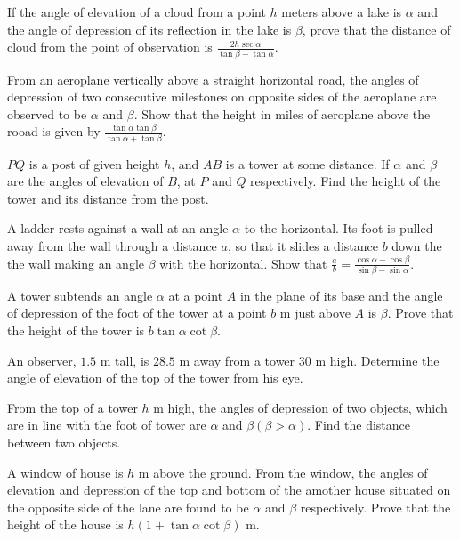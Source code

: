 \item If the angle of elevation of a cloud from a point $h$ meters above a lake is $\alpha$ and the angle of depression
  of its reflection in the lake is $\beta$, prove that the distance of cloud from the point of observation is
  $\frac{2h\sec\alpha}{\tan\beta - \tan\alpha}$.

\item From an aeroplane vertically above a straight horizontal road, the angles of depression of two consecutive milestones on
  opposite sides of the aeroplane are observed to be $\alpha$ and $\beta$. Show that the height in miles of
  aeroplane above the rooad is given by $\frac{\tan\alpha\tan\beta}{\tan\alpha + \tan\beta}$.

\item $PQ$ is a post of given height $h$, and $AB$ is a tower at some distance. If $\alpha$ and
  $\beta$ are the angles of elevation of $B$, at $P$ and $Q$ respectively. Find the height of the tower
  and its distance from the post.

\item A ladder rests against a wall at an angle $\alpha$ to the horizontal. Its foot is pulled away from the wall through a
  distance $a$, so that it slides a distance $b$ down the the wall making an angle $\beta$ with the
  horizontal. Show that $\frac{a}{b} = \frac{\cos\alpha - \cos\beta}{\sin\beta - \sin\alpha}$.

\item A tower subtends an angle $\alpha$ at a point $A$ in the plane of its base and the angle of depression of the foot
  of the tower at a point $b$ m just above $A$ is $\beta$. Prove that the height of the tower is
  $b\tan\alpha\cot\beta$.

\item An observer, $1.5$ m tall, is $28.5$ m away from a tower $30$ m high. Determine the angle of elevation of
  the top of the tower from his eye.

\item From the top of a tower $h$ m high, the angles of depression of two objects, which are in line with the foot of tower
  are $\alpha$ and $\beta (\beta > \alpha)$. Find the distance between two objects.

\item A window of house is $h$ m above the ground. From the window, the angles of elevation and depression of the top and
  bottom of the amother house situated on the opposite side of the lane are found to be $\alpha$ and $\beta$
  respectively. Prove that the height of the house is $h(1 + \tan\alpha\cot\beta)$ m.

